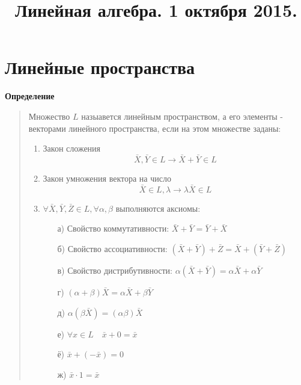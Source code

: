 \documentclass[11pt]{proc}
\title{Линейная алгебра. 1 октября 2015.}
\begin{document}
\pagestyle{empty}
\maketitle
\section{Линейные пространства}
\textbf{Определение}
\begin{quote}
	Множество $L$ назыавется линейным пространством, а его элементы - векторами линейного пространства, если на этом множестве заданы:
	\begin{enumerate}
		\item{Закон сложения \[\bar{X},\bar{Y}\in L \rightarrow \bar{X}+\bar{Y}\in L\]}
		\item{Закон умножения вектора на число \[\bar{X}\in L, \lambda \rightarrow \lambda\bar{X}\in L\]}
		\item{$\forall\bar{X},\bar{Y},\bar{Z} \in L, \forall\alpha,\beta$ выполняются аксиомы:
		\begin{itemize}
			\item[а)]{Свойство коммутативности: $\bar{X}+\bar{Y}=\bar{Y}+\bar{X}$}
			\item[б)]{Свойство ассоциативности: $(\bar{X}+\bar{Y})+\bar{Z}=\bar{X}+(\bar{Y}+\bar{Z})$}
			\item[в)]{Свойство дистрибутивности: $\alpha(\bar{X}+\bar{Y})=\alpha\bar{X}+\alpha\bar{Y}$}
			\item[г)]{$(\alpha+\beta)\bar{X}=\alpha\bar{X}+\beta\bar{Y}$}
			\item[д)]{$\alpha(\beta\bar{X})=(\alpha\beta)\bar{X}$}
			\item[е)]{$\forall x \in L \quad \bar{x}+0=\bar{x}$}
			\item[ё)]{$\bar{x}+(-\bar{x})=0$}
			\item[ж)]{$\bar{x}\cdot1=\bar{x}$}
		\end{itemize}
		}
	\end{enumerate}
\end{quote}
\end{document}
